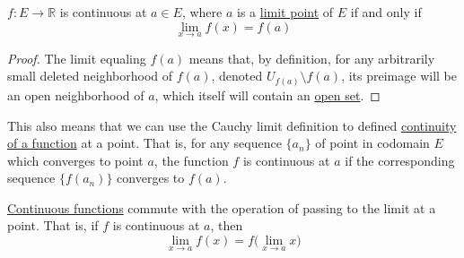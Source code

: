   \begin{lemma}
    \label{thm:existence-of-limits-of-continuous-functions}
    $f: E \to \mathbb{R}$ is continuous at $a \in E$, where $a$ is a \hyperref[pst-def:limit-point]{limit point} of $E$ if and only if 
    \begin{equation}
      \lim_{x \to a} f(x) = f(a)
    \end{equation}
  \end{lemma}
  \begin{proof}
    The limit equaling $f(a)$ means that, by definition, for any arbitrarily small deleted neighborhood of $f(a)$, denoted $U_{f(a)} \setminus f(a)$, its preimage will be an open neighborhood of $a$, which itself will contain an \hyperref[pst-def:open-set]{open set}. 
  \end{proof}

  This also means that we can use the Cauchy limit definition to defined \hyperref[def:continuity-of-a-function]{continuity of a function} at a point. That is, for any sequence $\{a_n\}$ of point in codomain $E$ which converges to point $a$, the function $f$ is continuous at $a$ if the corresponding sequence $\{f(a_n)\}$ converges to $f(a)$.

  \begin{theorem}
    \label{thm:continuity-commutes-with-limits}
    \hyperref[pst-def:continuous_func]{Continuous functions} commute with the operation of passing to the limit at a point. That is, if $f$ is continuous at $a$, then 
    \begin{equation}
      \lim_{x \to a} f(x) = f\Big( \lim_{x \to a} x \Big)
    \end{equation}
  \end{theorem}

